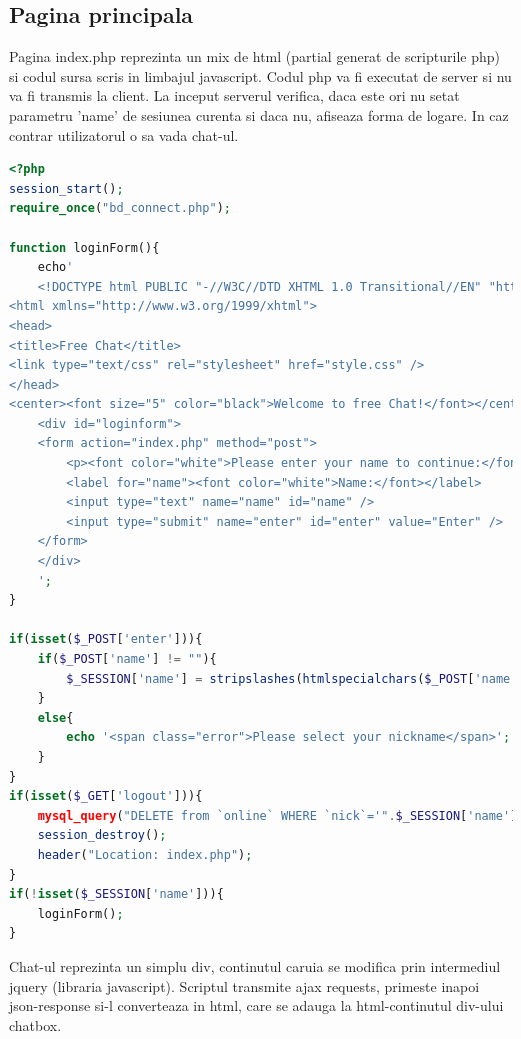 \documentclass[12pt]{article}
\begin{document}
\subsection{Pagina principala}
Pagina index.php reprezinta un mix de html (partial generat de scripturile php) si codul sursa scris in limbajul javascript. Codul php va fi executat de server si nu va fi transmis la client. La inceput serverul verifica, daca este ori nu setat parametru 'name' de sesiunea curenta si daca nu, afiseaza forma de logare. In caz contrar utilizatorul o sa vada chat-ul.
\newpage
\begin{lstlisting}[language=php, caption={Fisierul index.php. Logarea}, label=list2]
<?php
session_start();
require_once("bd_connect.php");
 
function loginForm(){
    echo'
    <!DOCTYPE html PUBLIC "-//W3C//DTD XHTML 1.0 Transitional//EN" "http://www.w3.org/TR/xhtml1/DTD/xhtml1-transitional.dtd">
<html xmlns="http://www.w3.org/1999/xhtml">
<head>
<title>Free Chat</title>
<link type="text/css" rel="stylesheet" href="style.css" />
</head>
<center><font size="5" color="black">Welcome to free Chat!</font></center><br>
    <div id="loginform">
    <form action="index.php" method="post">
        <p><font color="white">Please enter your name to continue:</font></p>
        <label for="name"><font color="white">Name:</font></label>
        <input type="text" name="name" id="name" />
        <input type="submit" name="enter" id="enter" value="Enter" />
    </form>
    </div>
    ';
}
 
if(isset($_POST['enter'])){
    if($_POST['name'] != ""){
        $_SESSION['name'] = stripslashes(htmlspecialchars($_POST['name']));
    }
    else{
        echo '<span class="error">Please select your nickname</span>';
    }
}
if(isset($_GET['logout'])){
    mysql_query("DELETE from `online` WHERE `nick`='".$_SESSION['name']."'");
    session_destroy();
    header("Location: index.php");
}
if(!isset($_SESSION['name'])){
    loginForm();
}	
\end{lstlisting}
Chat-ul reprezinta un simplu div, continutul caruia se modifica prin intermediul jquery (libraria javascript). Scriptul transmite ajax requests, primeste inapoi json-response si-l converteaza in html, care se adauga la html-continutul div-ului chatbox.
\end{document}
